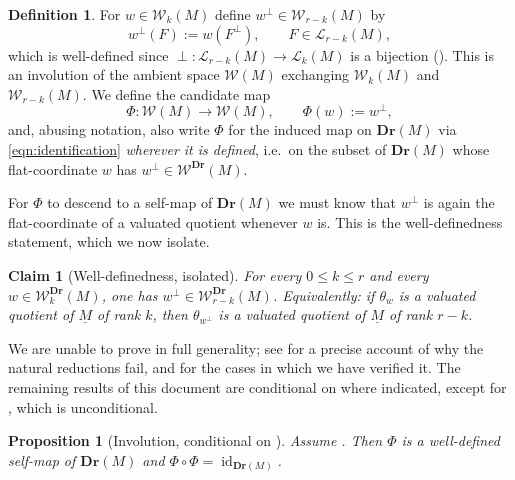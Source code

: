 \documentclass{article}
\newtheorem{proposition}[theorem]{Proposition}
\newtheorem{claim}[theorem]{Claim}
\theoremstyle{definition}
\newtheorem{definition}[theorem]{Definition}
\newcommand{\Dr}{\mathbf{Dr}}
\newcommand{\cLL}{\mathcal{L}}
\newcommand{\cW}{\mathcal{W}}
\begin{document}
\begin{definition}\label{def:Phi}
For $w\in\cW_k(M)$ define $w^{\perp}\in\cW_{r-k}(M)$ by
\begin{equation}\label{eqn:Phi-flat}
  w^{\perp}(F):=w(F^{\perp}),\qquad F\in\cLL_{r-k}(M),
\end{equation}
which is well-defined since $\perp\colon\cLL_{r-k}(M)\to\cLL_k(M)$ is a bijection ().
This is an involution of the ambient space $\cW(M)$ exchanging $\cW_k(M)$ and $\cW_{r-k}(M)$. We
define the candidate map
\[
  \Phi\colon \cW(M)\to\cW(M),\qquad \Phi(w):=w^{\perp},
\]
and, abusing notation, also write $\Phi$ for the induced map on $\Dr(M)$ via \eqref{eqn:identification}
\emph{wherever it is defined}, i.e.\ on the subset of $\Dr(M)$ whose flat-coordinate $w$ has
$w^{\perp}\in\cW^{\Dr}(M)$.
\end{definition}

For $\Phi$ to descend to a self-map of $\Dr(M)$ we must know that $w^{\perp}$ is again the
flat-coordinate of a valuated quotient whenever $w$ is. This is the well-definedness statement, which
we now isolate.

\begin{claim}[Well-definedness, isolated]\label{conj:wd-invariance}
For every $0\le k\le r$ and every $w\in\cW^{\Dr}_k(M)$, one has $w^{\perp}\in\cW^{\Dr}_{r-k}(M)$.
Equivalently: if $\theta_w$ is a valuated quotient of $\underline M$ of rank $k$, then
$\theta_{w^{\perp}}$ is a valuated quotient of $\underline M$ of rank $r-k$.
\end{claim}

We are unable to prove  in full generality; see  for a
precise account of why the natural reductions fail, and  for the cases in which we
have verified it. The remaining results of this document are conditional on
 where indicated, except for , which is unconditional.

\begin{proposition}[Involution, conditional on ]\label{prop:inv}
Assume . Then $\Phi$ is a well-defined self-map of $\Dr(M)$ and
$\Phi\circ\Phi=\operatorname{id}_{\Dr(M)}$.
\end{proposition}
\end{document}
